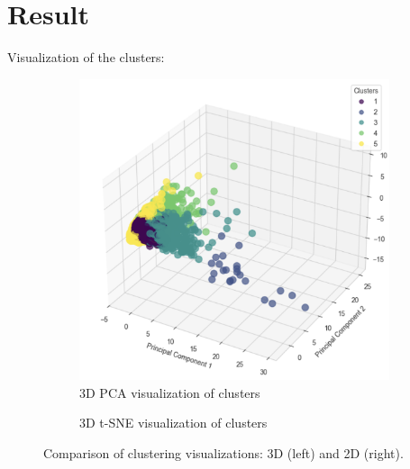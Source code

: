 \section{Result}
Visualization of the clusters:

\begin{figure}[H]
    \centering
    \begin{subfigure}[b]{0.45\textwidth}
        \centering
        \includegraphics[width=\textwidth]{src/figs/3d_PCA_HC.png}
        \caption{3D PCA visualization of clusters}
        \label{fig:pca}
    \end{subfigure}
    \hfill
    \begin{subfigure}[b]{0.45\textwidth}
        \centering
        \caption{3D t-SNE visualization of clusters}
        \label{fig:tsne}
    \end{subfigure}
    \caption{Comparison of clustering visualizations: 3D (left) and 2D (right).}
    \label{fig:comparison}
\end{figure}